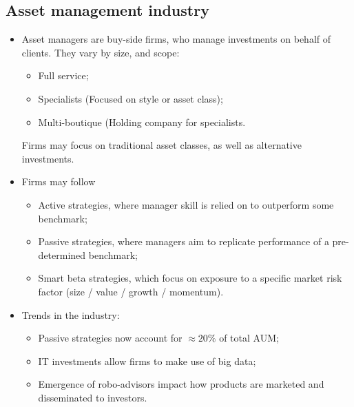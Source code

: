 \documentclass[../notes_compiled.tex]{subfiles}
\begin{document}
\subsection{Asset management industry}
\begin{itemize}
\item Asset managers are buy-side firms, who manage investments on behalf of clients. They vary by size, and scope:
\begin{itemize}
\item Full service;
\item Specialists (Focused on style or asset class);
\item Multi-boutique (Holding company for specialists.
\end{itemize}
Firms may focus on traditional asset classes, as well as alternative investments.
\item Firms may follow
\begin{itemize}
\item Active strategies, where manager skill is relied on to outperform some benchmark;
\item Passive strategies, where managers aim to replicate performance of a pre-determined benchmark;
\item Smart beta strategies, which focus on exposure to a specific market risk factor (size / value / growth / momentum).
\end{itemize}
\item Trends in the industry:
\begin{itemize}
\item Passive strategies now account for $\approx20\%$ of total AUM;
\item IT investments allow firms to make use of big data;
\item Emergence of robo-advisors impact how products are marketed and disseminated to investors.
\end{itemize}
\end{itemize}
\end{document}
